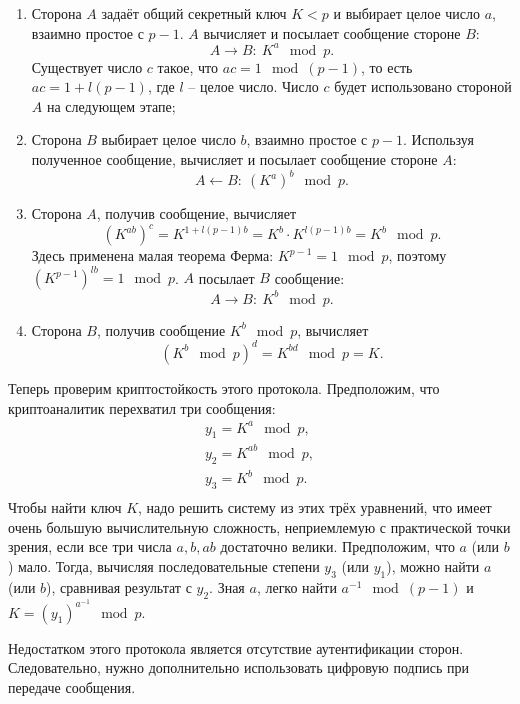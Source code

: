 \begin{enumerate}
    \item Сторона $A$ задаёт общий секретный ключ $K <p$ и выбирает целое число $a$, взаимно простое с $p-1$. $A$ вычисляет и посылает сообщение стороне $B$:
            \[ A \rightarrow B: ~ K^a \mod p. \]
        Существует число $c$ такое, что $a c =1 \mod (p-1)$, то есть $a c = 1 + l (p-1)$, где $l$ -- целое число. Число $c$ будет использовано стороной $A$ на следующем этапе;
    \item Сторона $B$ выбирает целое число $b$, взаимно простое с $p-1$. Используя полученное сообщение, вычисляет и посылает сообщение стороне $A$:
            \[ A \leftarrow B: ~ (K^a)^b \mod p. \]
    \item Сторона $A$, получив сообщение, вычисляет
        \[ \left( K^{ab} \right)^c = K^{1 + l (p-1) b} = K^b \cdot K^{l (p-1) b} = K^b \mod p. \]
        Здесь применена малая теорема Ферма: $K^{p-1} = 1 \mod p$, поэтому $\left( K^{p-1} \right)^{lb} = 1 \mod p$.
        $A$ посылает $B$ сообщение:
            \[ A \rightarrow B: ~ K^b \mod p. \]
    \item Сторона $B$, получив сообщение $K^{b}\mod p$, вычисляет
        \[ (K^b \mod p)^d = K^{bd} \mod p = K. \]
\end{enumerate}

Теперь проверим криптостойкость этого протокола. Предположим, что криптоаналитик перехватил три сообщения:
\[ \begin{array}{l}
    y_1 = K^a \mod p, \\
    y_2 = K^{ab} \mod p, \\
    y_3 = K^b \mod p. \\
\end{array} \]
Чтобы найти ключ $K$, надо решить систему из этих трёх уравнений, что имеет очень большую вычислительную сложность, неприемлемую с практической точки зрения, если все три числа $a, b, ab$ достаточно велики. Предположим, что $a$ (или $b$) мало. Тогда, вычисляя последовательные степени $y_3$ (или $y_1$), можно найти  $a$ (или $b$), сравнивая результат с $y_2$. Зная $a$, легко найти $a^{-1}\mod(p-1)$ и $K=(y_1)^{a^{-1}}\mod p$.

Недостатком этого протокола является отсутствие аутентификации сторон. Следовательно, нужно дополнительно использовать цифровую подпись при передаче сообщения.
